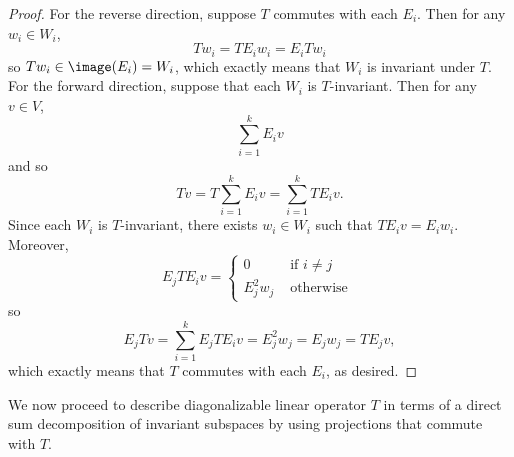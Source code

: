 \documentclass[linearalgebra]{subfiles}
\begin{document}
    \begin{proof}
        For the reverse direction, suppose $T$ commutes with each $E_i$. Then for any $w_i\in W_i$,
        \begin{equation*}
            Tw_i = TE_iw_i = E_iTw_i
        \end{equation*}
        so $Tw_i\in \image(E_i) = W_i$, which exactly means that $W_i$ is invariant under $T$. For the forward direction, suppose that each $W_i$ is $T$-invariant. Then for any $v\in V$,
        \begin{equation*}
            \sum^{k}_{i=1} E_iv
        \end{equation*}
        and so
        \begin{equation*}
            Tv = T \sum^{k}_{i=1} E_iv = \sum^{k}_{i=1} TE_iv.
        \end{equation*}
        Since each $W_i$ is $T$-invariant, there exists $w_i\in W_i$ such that $TE_iv = E_iw_i$. Moreover,
        \begin{equation*}
            E_jTE_iv =
            \begin{cases}
                0 & \text{ if }i\neq j \\
                E_j^2w_j & \text{ otherwise }
            \end{cases}
        \end{equation*}
        so
        \begin{equation*}
            E_jTv = \sum^{k}_{i=1} E_jTE_iv = E_j^2w_j = E_jw_j = TE_jv,
        \end{equation*}
        which exactly means that $T$ commutes with each $E_i$, as desired.
    \end{proof}

    \begin{remark}
        We now proceed to describe diagonalizable linear operator $T$ in terms of a direct sum decomposition of invariant subspaces by using projections that commute with $T$.
    \end{remark}
\end{document}
